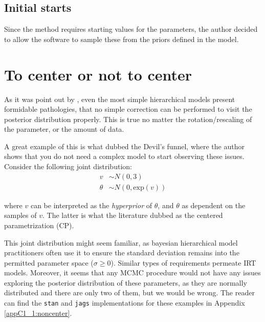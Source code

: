 
\subsection{Initial starts}

Since the method requires starting values for the parameters, the author decided to allow the software to sample these from the priors defined in the model.



\section{To center or not to center} \label{sect:noncenter}

As it was point out by \citet{Betancourt_et_al_2013}, even the most simple hierarchical models present formidable pathologies, that no simple correction can be performed to visit the posterior distribution properly. This is true no matter the rotation/rescaling of the parameter, or the amount of data. 

A great example of this is what \citet{McElreath_2020} dubbed the Devil's funnel, where the author shows that you do not need a complex model to start observing these issues. Consider the following joint distribution:
%
\begin{equation} \label{eq:devil}
	\begin{split}	
		v &\sim N(0, 3) \\
		\theta &\sim N(0, \text{exp}(v))
	\end{split}
\end{equation}

\noindent where $v$ can be interpreted as the \textit{hyperprior} of $\theta$, and $\theta$ as dependent on the samples of $v$. The latter is what the literature dubbed as the centered parametrization (CP).

This joint distribution might seem familiar, as bayesian hierarchical model practitioners often use it to ensure the standard deviation remains into the permitted parameter space ($\sigma \geq 0$). Similar types of requirements permeate IRT models. Moreover, it seems that any MCMC procedure would not have any issues exploring the posterior distribution of these parameters, as they are normally distributed and there are only two of them, but we would be wrong. The reader can find the \texttt{stan} and \texttt{jags} implementations for these examples in Appendix \ref{appC1_1:noncenter}.

